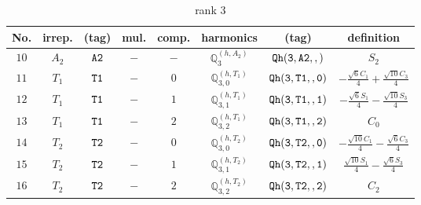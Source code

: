 \documentclass[fleqn,8pt]{jsarticle}
\begin{document}
\begin{table}[ht!]
\begin{center}
\caption{rank 3}
\renewcommand{\arraystretch}{1.3}
\begin{tabular}{cccccccc} \hline \hline
No. & irrep. & (tag) & mul. & comp. & harmonics & (tag) & definition \\ \hline
$ 10 $ & $ A_{2} $ & $ {\tt A2} $ & $ - $ & $ - $ & $ \mathbb{Q}_{3}^{(h,A_{2})} $ & $ {\tt Qh(3,A2,,)} $ & $ S_{2} $ \\
$ 11 $ & $ T_{1} $ & $ {\tt T1} $ & $ - $ & $ 0 $ & $ \mathbb{Q}_{3,0}^{(h,T_{1})} $ & $ {\tt Qh(3,T1,,0)} $ & $ - \frac{\sqrt{6} C_{1}}{4} + \frac{\sqrt{10} C_{3}}{4} $ \\
$ 12 $ & $ T_{1} $ & $ {\tt T1} $ & $ - $ & $ 1 $ & $ \mathbb{Q}_{3,1}^{(h,T_{1})} $ & $ {\tt Qh(3,T1,,1)} $ & $ - \frac{\sqrt{6} S_{1}}{4} - \frac{\sqrt{10} S_{3}}{4} $ \\
$ 13 $ & $ T_{1} $ & $ {\tt T1} $ & $ - $ & $ 2 $ & $ \mathbb{Q}_{3,2}^{(h,T_{1})} $ & $ {\tt Qh(3,T1,,2)} $ & $ C_{0} $ \\
$ 14 $ & $ T_{2} $ & $ {\tt T2} $ & $ - $ & $ 0 $ & $ \mathbb{Q}_{3,0}^{(h,T_{2})} $ & $ {\tt Qh(3,T2,,0)} $ & $ - \frac{\sqrt{10} C_{1}}{4} - \frac{\sqrt{6} C_{3}}{4} $ \\
$ 15 $ & $ T_{2} $ & $ {\tt T2} $ & $ - $ & $ 1 $ & $ \mathbb{Q}_{3,1}^{(h,T_{2})} $ & $ {\tt Qh(3,T2,,1)} $ & $ \frac{\sqrt{10} S_{1}}{4} - \frac{\sqrt{6} S_{3}}{4} $ \\
$ 16 $ & $ T_{2} $ & $ {\tt T2} $ & $ - $ & $ 2 $ & $ \mathbb{Q}_{3,2}^{(h,T_{2})} $ & $ {\tt Qh(3,T2,,2)} $ & $ C_{2} $ \\
 \hline \hline
\end{tabular}
\end{center}
\end{table}
\end{document}
